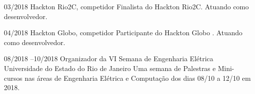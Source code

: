 \documentclass[]{friggeri-cv} %
\begin{document}
\begin{entrylist}
\entry
{03/2018 }
{\hspace{.15cm}Hackton Rio2C, competidor}
{}
{Finalista do Hackton Rio2C. Atuando como desenvolvedor.}

\entry
{04/2018 }
{\hspace{.15cm}Hackton Globo, competidor}
{}
{Participante do Hackton Globo . Atuando como desenvolvedor.}



\entry
{08/2018 --10/2018}
{\hspace{.15cm} Organizador da VI Semana de Engenharia Elétrica }
{Universidade do Estado do Rio de Janeiro}
{Uma semana de Palestras e Mini-cursos nas áreas de Engenharia Elétrica e Computação dos dias 08/10 a 12/10 em 2018.}




\end{entrylist}




\end{document}
